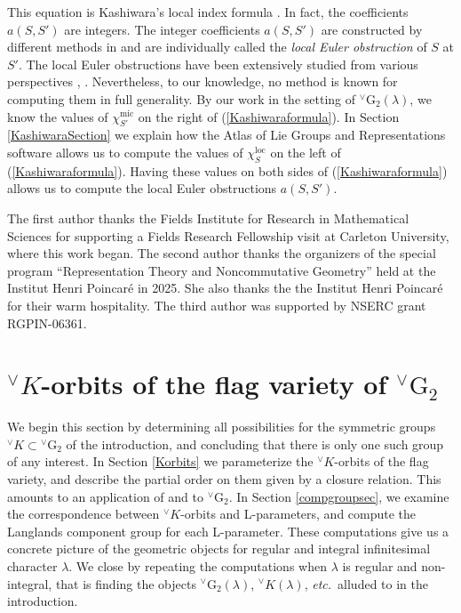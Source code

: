\documentclass[a4paper, 11pt]{article}
\begin{document}
This equation is Kashiwara's local index formula \cite[Section~2]{Kashiwara73}. 
In fact, the coefficients  $a(S, S')$ are integers.
The integer coefficients $a(S, S')$ are constructed by different
methods in \cite[Section~3]{MacPherson74} and are
individually called
the \emph{local Euler obstruction} of $S$ at $S'$.  
The local Euler obstructions have been extensively studied from various
perspectives  
\cite[\S 11.7]{Ginsburg86}, \cite{Gonzalez-Sprinberg}.  Nevertheless,
to our knowledge, no method is known for computing them in full
generality.  By our work in the setting of ${^\vee}\mathrm{G}_{2}(\lambda)$,
we know the values of $\chi_{S'}^{\mathrm{mic}}$ on the right of
(\ref{Kashiwaraformula}).  
In Section \ref{KashiwaraSection} we explain how the Atlas of Lie Groups and
Representations software allows us to compute the values of
$\chi_{S}^{\mathrm{loc}}$  on the left of (\ref{Kashiwaraformula}).  
Having these values on both sides of (\ref{Kashiwaraformula}) allows
us to compute  the local Euler
obstructions $a(S,S')$.


The first author thanks the Fields Institute for Research in
Mathematical Sciences for supporting a Fields Research Fellowship
visit at Carleton University, where this work began. The second author
thanks the organizers of the special program ``Representation Theory
and Noncommutative Geometry'' held at the Institut Henri Poincar\'{e} in
2025. She also thanks the the Institut Henri Poincar\'{e} for their warm
hospitality.  The third author was supported by NSERC grant
RGPIN-06361.



\section{${^\vee}K$-orbits of the flag variety of ${^\vee}\mathrm{G}_{2}$}
\label{section:Korbitsflag}

We begin this section by determining all possibilities for the symmetric
groups ${^\vee}K \subset {^\vee}\mathrm{G}_{2}$ of the introduction,
and concluding that there is   
only one such group of any interest. In Section \ref{Korbits} we
parameterize the ${^\vee}K$-orbits of the flag variety,
and describe the partial order on them given by a closure relation.
This amounts to an application of \cite{Adams-Fokko} and \cite{RS90}
to ${^\vee}\mathrm{G}_{2}$.  In Section \ref{compgroupsec}, we examine
the correspondence between ${^\vee}K$-orbits and L-parameters, and
compute the Langlands component group for each L-parameter.  These
computations give us a concrete picture of the geometric objects for
regular and integral infinitesimal character $\lambda$.  We close by
repeating the computations when  $\lambda$ is regular and
non-integral, that is finding the objects
${^\vee}\mathrm{G}_{2}(\lambda)$,  ${^\vee}K(\lambda)$,
\emph{etc.}~alluded to in the introduction.    
\end{document}
